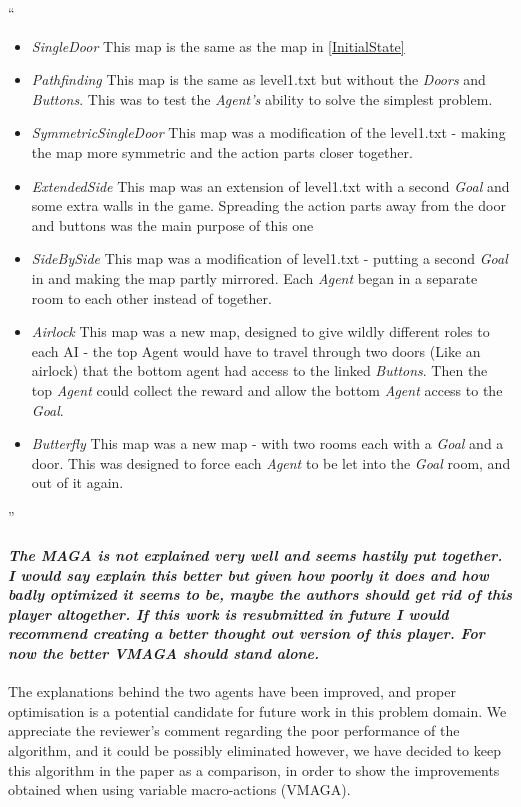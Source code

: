 \documentclass{article}
\begin{document}
``\begin{itemize}
\item{\emph{SingleDoor} This map is the same as the map in \ref{InitialState}}
\item{\emph{Pathfinding} This map is the same as level1.txt but without the \emph{Doors} and \emph{Buttons}. This was to test the \emph{Agent's} ability to solve the simplest problem.}
\item{\emph{SymmetricSingleDoor} This map was a modification of the level1.txt - making the map more symmetric and the action parts closer together.}
\item{\emph{ExtendedSide} This map was an extension of level1.txt with a second \emph{Goal} and some extra walls in the game. Spreading the action parts away from the door and buttons was the main purpose of this one}
\item{\emph{SideBySide} This map was a modification of level1.txt - putting a second \emph{Goal} in and making the map partly mirrored. Each \emph{Agent} began in a separate room to each other instead of together.}
\item{\emph{Airlock} This map was a new map, designed to give wildly different roles to each AI - the top Agent would have to travel through two doors (Like an airlock) that the bottom agent had access to the linked \emph{Buttons}. Then the top \emph{Agent} could collect the reward and allow the bottom \emph{Agent} access to the \emph{Goal}.}
\item{\emph{Butterfly} This map was a new map - with two rooms each with a \emph{Goal} and a door. This was designed to force each \emph{Agent} to be let into the \emph{Goal} room, and out of it again.}
\end{itemize}''

\paragraph*{\textit{The MAGA is not explained very well and seems hastily put together. I would say explain this better but given how poorly it does and how badly optimized it seems to be, maybe the authors should get rid of this player altogether. If this work is resubmitted in future I would recommend creating a better thought out version of this player. For now the better VMAGA should stand alone.
}}
The explanations behind the two agents have been improved, and proper optimisation is a potential candidate for future work in this problem domain. We appreciate the reviewer's comment regarding the poor performance of the algorithm, and it could be possibly eliminated however, we have decided to keep this algorithm in the paper as a comparison, in order to show the improvements obtained when using variable macro-actions (VMAGA).
\end{document}
